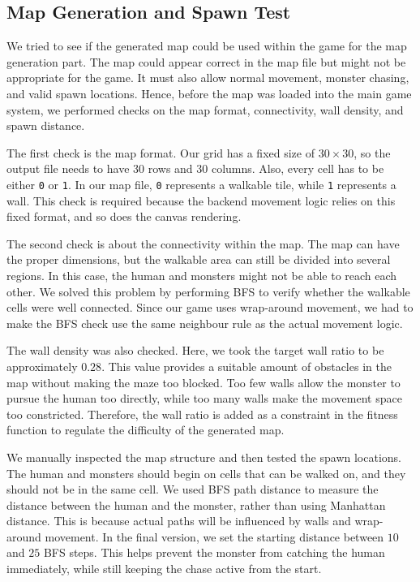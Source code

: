 \documentclass[12pt,a4paper]{article}
\begin{document}
\subsection{Map Generation and Spawn Test}

We tried to see if the generated map could be used within the game for the map generation part. The map could appear correct in the map file but might not be appropriate for the game. It must also allow normal movement, monster chasing, and valid spawn locations. Hence, before the map was loaded into the main game system, we performed checks on the map format, connectivity, wall density, and spawn distance.

The first check is the map format. Our grid has a fixed size of $30 \times 30$, so the output file needs to have 30 rows and 30 columns. Also, every cell has to be either \texttt{0} or \texttt{1}. In our map file, \texttt{0} represents a walkable tile, while \texttt{1} represents a wall. This check is required because the backend movement logic relies on this fixed format, and so does the canvas rendering.

The second check is about the connectivity within the map. The map can have the proper dimensions, but the walkable area can still be divided into several regions. In this case, the human and monsters might not be able to reach each other. We solved this problem by performing BFS to verify whether the walkable cells were well connected. Since our game uses wrap-around movement, we had to make the BFS check use the same neighbour rule as the actual movement logic.

The wall density was also checked. Here, we took the target wall ratio to be approximately $0.28$. This value provides a suitable amount of obstacles in the map without making the maze too blocked. Too few walls allow the monster to pursue the human too directly, while too many walls make the movement space too constricted. Therefore, the wall ratio is added as a constraint in the fitness function to regulate the difficulty of the generated map.

We manually inspected the map structure and then tested the spawn locations. The human and monsters should begin on cells that can be walked on, and they should not be in the same cell. We used BFS path distance to measure the distance between the human and the monster, rather than using Manhattan distance. This is because actual paths will be influenced by walls and wrap-around movement. In the final version, we set the starting distance between $10$ and $25$ BFS steps. This helps prevent the monster from catching the human immediately, while still keeping the chase active from the start.
\end{document}
